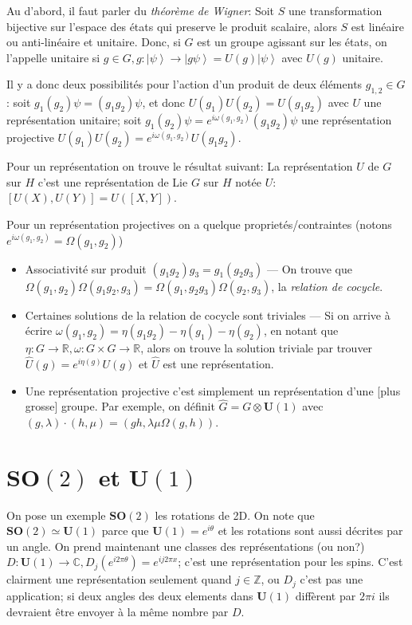 \documentclass[10pt]{report}
\newcommand{\ket}[1]{\left|#1\right>}
\begin{document}
Au d'abord, il faut parler du \emph{th\'eor\`eme de Wigner}: Soit $S$ une transformation bijective sur l'espace des \'etats qui preserve le produit scalaire, alors $S$ est lin\'eaire ou anti-lin\'eaire et unitaire. Donc, si $G$ est un groupe agissant sur les \'etats, on l'appelle unitaire si $g \in G, g:\ket{\psi} \to \ket{g\psi} = U(g) \ket{\psi}$ avec $U(g)$ unitaire.

Il y a donc deux possibilit\'es pour l'action d'un produit de deux \'el\'ements $g_{1,2} \in G$: soit $g_1(g_2)\psi = (g_1g_2) \psi$, et donc $U(g_1)U(g_2) = U(g_1g_2)$ avec $U$ une repr\'esentation unitaire; soit $g_1(g_2)\psi = e^{i\omega(g_1,g_2)}(g_1g_2)\psi$ une repr\'esentation projective $U(g_1)U(g_2) = e^{i\omega(g_1, g_2)}U(g_1g_2)$.

Pour un repr\'esentation on trouve le r\'esultat suivant: La repr\'esentation $U$ de $G$ sur $H$ c'est une repr\'esentation de Lie $G$ sur $H$ not\'ee $U$: $[U(X),U(Y)] = U([X,Y])$. 

Pour un repr\'esentation projectives on a quelque propriet\'es/contraintes (notons $e^{i\omega(g_1, g_2)} = \Omega(g_1,g_2)$)
\begin{itemize}
    \item Associativit\'e sur produit $(g_1g_2)g_3 = g_1(g_2g_3)$ --- On trouve que $\Omega(g_1,g_2)\Omega(g_1g_2,g_3) = \Omega(g_1,g_2g_3)\Omega(g_2,g_3)$, la \emph{relation de cocycle}.
    \item Certaines solutions de la relation de cocycle sont triviales --- Si on arrive \`a \'ecrire $\omega(g_1,g_2) = \eta(g_1g_2) - \eta(g_1) - \eta(g_2)$, en notant que $\eta:G \to \mathbb{R}, \omega: G \times G \to \mathbb{R}$, alors on trouve la solution triviale par trouver $\hat{U}(g) = e^{i\eta(g)}U(g)$ et $\hat{U}$ est une repr\'esentation.
    \item Une repr\'esentation projective c'est simplement un repr\'esentation d'une [plus grosse] groupe. Par exemple, on d\'efinit $\hat{G} = G \otimes \mathbf{U}(1)$ avec $(g,\lambda) \cdot (h,\mu) = (gh, \lambda \mu \Omega(g,h))$.
\end{itemize}

\section{$\mathbf{SO}(2)$ et $\mathbf{U}(1)$}

On pose un exemple $\mathbf{SO}(2)$ les rotations de 2D. On note que $\mathbf{SO}(2) \simeq \mathbf{U}(1)$ parce que $\mathbf{U}(1) = e^{i\theta}$ et les rotations sont aussi d\'ecrites par un angle. On prend maintenant une classes des repr\'esentations (ou non?) $D: \mathbf{U}(1) \to \mathbb{C}, D_j(e^{i2\pi\theta}) = e^{ij2\pi x}$; c'est une repr\'esentation pour les spins. C'est clairment une repr\'esentation seulement quand $j \in \mathbb{Z}$, ou $D_j$ c'est pas une application; si deux angles des deux elements dans $\mathbf{U}(1)$ diff\`erent par $2\pi i$ ils devraient \^etre envoyer \`a la m\^eme nombre par $D$.
\end{document}
